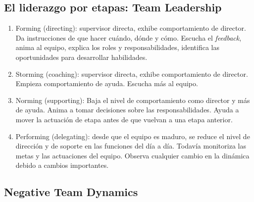 \documentclass[oneside]{book}
\begin{document}
\subsection{El liderazgo por etapas: Team Leadership}

\begin{enumerate}
	\item Forming (directing): supervisor directa, exhibe comportamiento de director. Da instrucciones de que hacer cuándo, dónde y cómo. Escucha el \textit{feedback}, anima al equipo, explica los roles y responsabilidades, identifica las oportunidades para desarrollar habilidades.
	\item Storming (coaching): supervisor directa, exhibe comportamiento de director. Empieza comportamiento de ayuda. Escucha más al equipo.
	\item Norming (supporting): Baja el nivel de comportamiento como director y más de ayuda. Anima a tomar decisiones sobre las responsabilidades. Ayuda a mover la actuación de etapa antes de que vuelvan a una etapa anterior.
	\item Performing (delegating): desde que el equipo es maduro, se reduce el nivel de dirección y de soporte en las funciones del día a día. Todavía monitoriza las metas y las actuaciones del equipo. Observa cualquier cambio en la dinámica debido a cambios importantes. 
\end{enumerate}

\subsection{Negative Team Dynamics}
\end{document}
